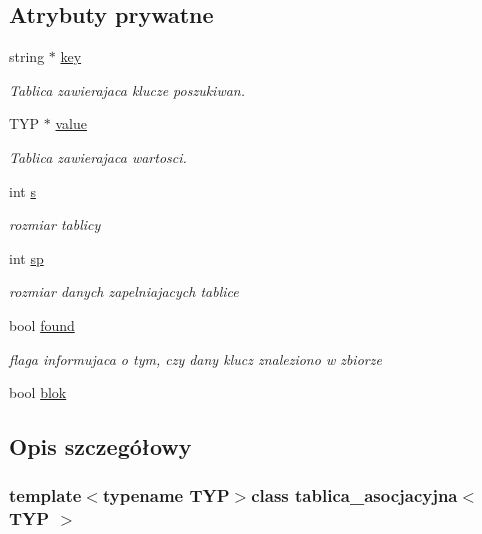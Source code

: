 \subsection*{Atrybuty prywatne}
\begin{DoxyCompactItemize}
\item 
string $\ast$ \hyperlink{classtablica__asocjacyjna_aefde9ad3347d42f36cab258144bacc1f}{key}
\begin{DoxyCompactList}\small\item\em Tablica zawierajaca klucze poszukiwan. \end{DoxyCompactList}\item 
T\-Y\-P $\ast$ \hyperlink{classtablica__asocjacyjna_a28719743b86b0a16db652afda20b665c}{value}
\begin{DoxyCompactList}\small\item\em Tablica zawierajaca wartosci. \end{DoxyCompactList}\item 
int \hyperlink{classtablica__asocjacyjna_a4a9d8aa0a03fd1ccf2fa7980d61bc197}{s}
\begin{DoxyCompactList}\small\item\em rozmiar tablicy \end{DoxyCompactList}\item 
int \hyperlink{classtablica__asocjacyjna_a2af0a8be0f335f5ad09f908cb08c0039}{sp}
\begin{DoxyCompactList}\small\item\em rozmiar danych zapelniajacych tablice \end{DoxyCompactList}\item 
bool \hyperlink{classtablica__asocjacyjna_aa3423d398d1a6b96e3f42398a2ce5a1e}{found}
\begin{DoxyCompactList}\small\item\em flaga informujaca o tym, czy dany klucz znaleziono w zbiorze \end{DoxyCompactList}\item 
bool \hyperlink{classtablica__asocjacyjna_a384365c022138ea28ce079e0173e00ab}{blok}
\end{DoxyCompactItemize}


\subsection{Opis szczegółowy}
\subsubsection*{template$<$typename T\-Y\-P$>$class tablica\-\_\-asocjacyjna$<$ T\-Y\-P $>$}

